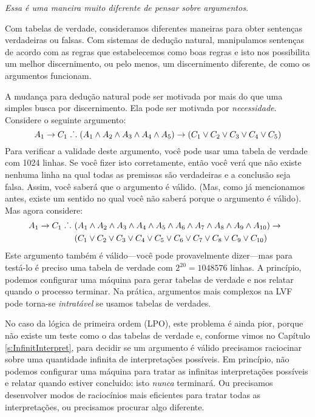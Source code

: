\emph{Essa \'e uma maneira muito diferente de pensar sobre argumentos.} 

Com tabelas de verdade,  consideramos diferentes maneiras  para obter senten\c cas verdadeiras ou falsas. Com sistemas de dedu\c c\~ao natural, manipulamos  senten\c cas de acordo com as regras que estabelecemos como boas regras e isto nos possibilita um melhor discernimento, ou pelo menos, um discernimento diferente,  de como os argumentos funcionam. 

A mudan\c ca para dedu\c c\~ao natural pode ser motivada por mais do que uma simples busca por discernimento. Ela pode ser motivada por  \emph{necessidade}. Considere o seguinte argumento:
$$A_1 \rightarrow C_1 \mathrel{\ldotp\dot{}\,\ldotp} (A_1 \wedge A_2 \wedge A_3 \wedge A_4 \wedge A_5) \rightarrow (C_1 \vee C_2 \vee C_3 \vee C_4 \vee C_5)$$
Para verificar a validade deste argumento, voc\^e   pode usar uma tabela de verdade com 1024 linhas. Se voc\^e fizer isto corretamente, ent\~ao voc\^e ver\'a que  n\~ao existe nenhuma linha na qual todas as premissas s\~ao verdadeiras e a conclus\~ao seja falsa.  Assim, voc\^e saber\'a que o argumento \'e v\'alido.  (Mas,  como  j\'a mencionamos antes, existe um sentido no qual voc\^e n\~ao saber\'a porque o argumento \'e v\'alido). Mas agora considere: 
\begin{align*}
A_1 \rightarrow C_1 \mathrel{\ldotp\dot{}\,\ldotp}\ & (A_1 \wedge A_2 \wedge A_3 \wedge A_4 \wedge A_5 \wedge A_6 \wedge A_7 \wedge A_8 \wedge A_9 \wedge A_{10}) \rightarrow \phantom{(}\\
&(C_1 \vee C_2 \vee C_3 \vee C_4 \vee C_5 \vee C_6 \vee C_7 \vee C_8 \vee C_9 \vee C_{10})
\end{align*}
Este argumento tamb\'em \'e v\'alido---voc\^e pode provavelmente dizer---mas para test\'a-lo \'e preciso uma tabela de verdade com
 $2^{20} = 1048576$ linhas.  A princ\'ipio, podemos configurar uma m\'aquina para gerar tabelas de verdade e nos relatar quando o processo terminar. Na pr\'atica, argumentos mais complexos na LVF pode torna-se \emph{intrat\'avel} se usamos tabelas de verdades. 
 
  
No caso da lógica de primeira ordem (LPO), este problema é ainda pior, porque não existe um teste como o das tabelas de verdade e, conforme vimos no Capítulo \ref{s:InfinitInterpret}, para decidir se um argumento é válido precisamos raciocinar sobre uma quantidade infinita de interpretações possíveis.
Em princ\'ipio, n\~ao podemos configurar uma m\'aquina para tratar as infinitas interpreta\c c\~oes poss\'iveis e relatar quando estiver  concluido:  isto  \emph{nunca}  terminar\'a. Ou precisamos desenvolver modos de racioc\'inios mais eficientes para tratar todas as interpreta\c c\~oes, ou precisamos procurar algo diferente. 

